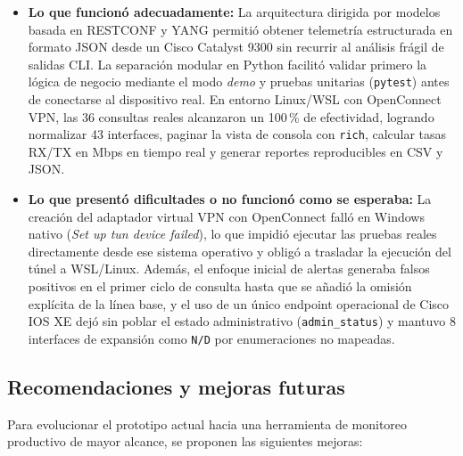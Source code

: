 \documentclass[12pt,a4paper]{article}
\begin{document}
\begin{itemize}
    \item \textbf{Lo que funcionó adecuadamente:} La arquitectura dirigida por modelos basada en RESTCONF y YANG permitió obtener telemetría estructurada en formato JSON desde un Cisco Catalyst 9300 sin recurrir al análisis frágil de salidas CLI. La separación modular en Python facilitó validar primero la lógica de negocio mediante el modo \textit{demo} y pruebas unitarias (\texttt{pytest}) antes de conectarse al dispositivo real. En entorno Linux/WSL con OpenConnect VPN, las 36 consultas reales alcanzaron un 100\,\% de efectividad, logrando normalizar 43 interfaces, paginar la vista de consola con \texttt{rich}, calcular tasas RX/TX en Mbps en tiempo real y generar reportes reproducibles en CSV y JSON.
    \item \textbf{Lo que presentó dificultades o no funcionó como se esperaba:} La creación del adaptador virtual VPN con OpenConnect falló en Windows nativo (\textit{Set up tun device failed}), lo que impidió ejecutar las pruebas reales directamente desde ese sistema operativo y obligó a trasladar la ejecución del túnel a WSL/Linux. Además, el enfoque inicial de alertas generaba falsos positivos en el primer ciclo de consulta hasta que se añadió la omisión explícita de la línea base, y el uso de un único endpoint operacional de Cisco IOS XE dejó sin poblar el estado administrativo (\texttt{admin\_status}) y mantuvo 8 interfaces de expansión como \texttt{N/D} por enumeraciones no mapeadas.
\end{itemize}

\subsection{Recomendaciones y mejoras futuras}

Para evolucionar el prototipo actual hacia una herramienta de monitoreo productivo de mayor alcance, se proponen las siguientes mejoras:
\end{document}
